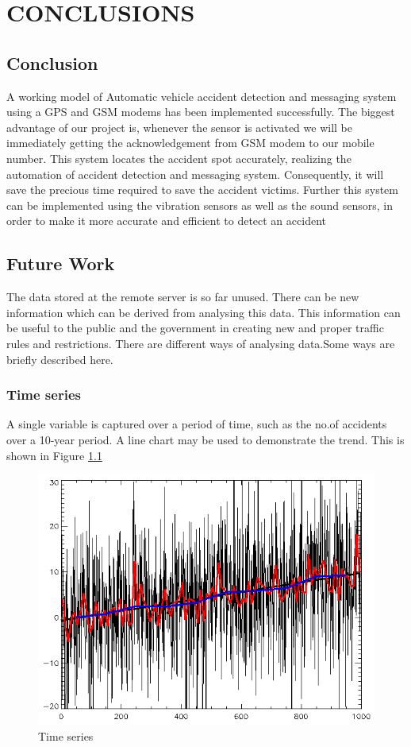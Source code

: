 \chapter{CONCLUSIONS} %
\section{Conclusion}
A working model of Automatic vehicle accident detection and messaging system using a GPS and GSM modems has been implemented successfully. The biggest advantage of our project is, whenever the sensor is activated we will be immediately getting the acknowledgement from GSM modem to our mobile number. This system locates the accident spot accurately, realizing the automation of accident detection and messaging system. Consequently, it will save the precious time required to save the accident victims. Further this system can be implemented using the vibration sensors as well as the sound sensors, in order to make it more accurate and efficient to detect an accident

\section{Future Work}

The data stored at the remote server is so far unused. There can be new information which can be derived from analysing this data. This information can be useful to the public and the government in creating new and proper traffic rules and restrictions. There are different ways of analysing data.Some ways are briefly described here.

\subsection{Time series}
A single variable is captured over a period of time, such as the no.of accidents over a 10-year period. A line chart may be used to demonstrate the trend. This is shown in Figure \ref{fig:time}

\begin{figure}[h!]
	\centering
	\includegraphics[scale=0.3]{time}
	\caption{Time series}
	\label{fig:time}
\end{figure}

